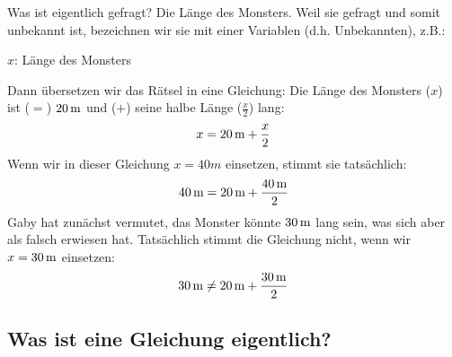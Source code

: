 \documentclass[%
11pt,%
twoside,%
titlepage,%
german,%
]{scrartcl}
\begin{document}
Was ist eigentlich gefragt? Die L\"ange des Monsters. Weil sie gefragt und somit unbekannt ist, bezeichnen wir sie mit einer Variablen (d.h. Unbekannten), z.B.:
\begin{center}
  $x$: L\"ange des Monsters
\end{center}
Dann \"ubersetzen wir das R\"atsel in eine Gleichung: Die L\"ange des Monsters ($x$) ist ($=$) $\unit[20]{m}$ und ($+$) seine halbe L\"ange ($\frac{x}{2}$) lang:
\begin{displaymath}
  x = \unit[20]{m} + \frac{x}{2}
\end{displaymath}
Wenn wir in dieser Gleichung $x=40\unit{m}$ einsetzen, stimmt sie tats\"achlich:
\begin{displaymath}
  \unit[40]{m} = \unit[20]{m}+\frac{\unit[40]{m}}{2}
\end{displaymath}
Gaby hat zun\"achst vermutet, das Monster k\"onnte $\unit[30]{m}$ lang sein, was sich aber als falsch erwiesen hat. Tats\"achlich stimmt die Gleichung nicht, wenn wir $x=\unit[30]{m}$ einsetzen:
\begin{displaymath}
  \unit[30]{m} \neq \unit[20]{m} + \frac{\unit[30] {m}}{2}
\end{displaymath}

\subsection{Was ist eine Gleichung eigentlich?}
\label{lingl:was}
\end{document}
